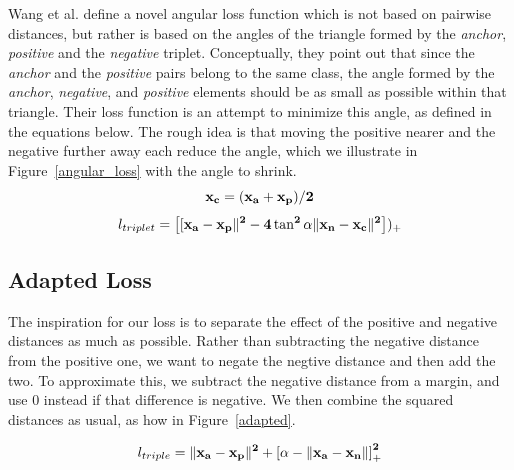 Wang et al. \cite{DBLP:journals/corr/abs-1708-01682} define a novel
angular loss function which is not based on pairwise distances, but
rather is based on the angles of the triangle formed by the
\textit{anchor}, \textit{positive} and the \textit{negative} triplet.
Conceptually, they point out that since the \textit{anchor} and the
\textit{positive} pairs belong to the same class, the angle formed by
the \textit{anchor}, \textit{negative}, and \textit{positive} elements
should be as small as possible within that triangle.  Their loss
function is an attempt to minimize this angle, as defined in the
equations below.  The rough idea is that moving the positive nearer
and the negative further away each reduce the angle, which we
illustrate in Figure~\ref{angular_loss} with the angle to shrink.
\begin{equation}
\bf{x_{c}} = (\bf{x_{a}} + \bf{x_{p}}) / 2
\end{equation}
\begin{equation}
l_{triplet} = \left[[\bf{x_{a}} - \bf{x_{p}}\|^2 - 4 \tan^2 \alpha \|\bf{x_{n}} - \bf{x_{c}}\|^2 \right])_{+}
\end{equation}

\subsection{Adapted Loss}

The inspiration for our loss is to separate the effect of the positive
and negative distances as much as possible.  Rather than subtracting
the negative distance from the positive one, we want to negate the
negtive distance and then add the two.  To approximate this, we
subtract the negative distance from a margin, and use 0 instead if
that difference is negative.  We then combine the squared distances as
usual, as how in Figure~\ref{adapted}.

\begin{equation}
  l_{triple} =  \|\bf{x_a} - \bf{x_p}\|^2 + \left[ \alpha - \|\bf{x_a} -\bf{x_n}\| \right]_+^2
\label{adapted}
\end{equation}


